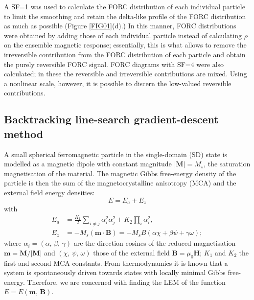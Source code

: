 \par
A SF=1 was used to calculate the FORC distribution of each individual particle to limit the smoothing and retain the delta-like profile of the FORC distribution as much as possible (Figure \ref{FIG01}(d).) In this manner, FORC distributions were obtained by adding those of each individual particle instead of calculating $\rho$ on the ensemble magnetic response; essentially, this is what allows to remove the irreversible contribution from the FORC distribution of each particle and obtain the purely reversible FORC signal. FORC diagrams with SF=4 were also calculated; in these the reversible and irreversible contributions are mixed. Using a nonlinear scale, however, it is possible to discern the low-valued reversible contributions.\par

\subsection{Backtracking line-search gradient-descent method}\label{grad method}
A small spherical ferromagnetic particle in the single-domain (SD) state is modelled as a magnetic dipole with constant magnitude $|\boldsymbol{M}| = M_s$, the saturation magnetisation of the material. The magnetic Gibbs free-energy density of the particle is then the sum of the magnetocrystalline anisotropy (MCA) and the external field energy densities:
\begin{equation}\label{EQ:ENERGY}
E = E_a +E_z
\end{equation}
with
\begin{align}
E_a &= \frac{K_1}{2}\sum_{i\neq j}\alpha_i^2 \alpha_j^2 + K_2 \prod_i \alpha_i^2,\\
E_z &= - M_s\left( \boldsymbol{m} \cdot \boldsymbol{B}\right) = -M_sB \left( \alpha\chi + \beta\psi + \gamma\omega\right);
\end{align}
where $\alpha_i = \left(\alpha,\,\beta,\,\gamma\right)$ are the direction cosines of the reduced magnetisation $\boldsymbol{m} = \boldsymbol{M}/|\boldsymbol{M}|$ and $\left(\chi,\,\psi,\,\omega\right)$ those of the external field $\boldsymbol{B}=\mu_0 \boldsymbol{H}$; $K_1$ and $K_2$ the first and second MCA constants. From thermodynamics it is known that a system is spontaneously driven towards states with locally minimal Gibbs free-energy. Therefore, we are concerned with finding the LEM of the function $E=E(\boldsymbol{m},\,\boldsymbol{B})$.\par

